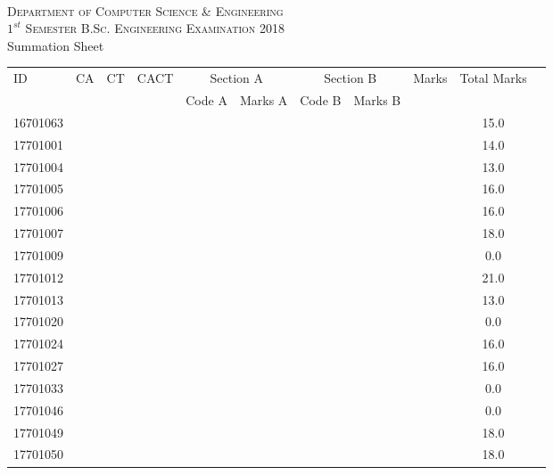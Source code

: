 \documentclass[12pt]{article}
\begin{document}
    \centering
    \begin{minipage}[m]{.8\textwidth} \centering 
	\smallskip
	\\
	\textsc{Department of Computer Science \& Engineering}\\
	\textsc{$1^{st}$ Semester B.Sc. Engineering Examination 2018}\\
	{\large {\sc Summation Sheet}}\\  
    \end{minipage} 
    \begin{center} 
	\renewcommand{\arraystretch}{1.08}
	\begin{small}
    \begin{tabular}{|l|c|c|c|c|c|c|c|c|c|c|} \hline
	\multirow{2}{*}{ID} & 	\multirow{2}{*}{CA}  & 	\multirow{2}{*}{CT}  & 	\multirow{2}{*}{CACT}  & \multicolumn{2 }{|c|}{Section A}& \multicolumn{2 }{c|}{Section B} & 	\multirow{2}{*}{Marks}  & 	\multirow{2}{*}{Total Marks}  \\ 
	&  &  &  & Code A & Marks A & Code B & Marks B&  &  \\ \hline
16701063 &  &  &  &  &  &  &  &  & 15.0\\ \hline 
17701001 &  &  &  &  &  &  &  &  & 14.0\\ \hline 
17701004 &  &  &  &  &  &  &  &  & 13.0\\ \hline 
17701005 &  &  &  &  &  &  &  &  & 16.0\\ \hline 
17701006 &  &  &  &  &  &  &  &  & 16.0\\ \hline 
17701007 &  &  &  &  &  &  &  &  & 18.0\\ \hline 
17701009 &  &  &  &  &  &  &  &  & 0.0\\ \hline 
17701012 &  &  &  &  &  &  &  &  & 21.0\\ \hline 
17701013 &  &  &  &  &  &  &  &  & 13.0\\ \hline 
17701020 &  &  &  &  &  &  &  &  & 0.0\\ \hline 
17701024 &  &  &  &  &  &  &  &  & 16.0\\ \hline 
17701027 &  &  &  &  &  &  &  &  & 16.0\\ \hline 
17701033 &  &  &  &  &  &  &  &  & 0.0\\ \hline 
17701046 &  &  &  &  &  &  &  &  & 0.0\\ \hline 
17701049 &  &  &  &  &  &  &  &  & 18.0\\ \hline 
17701050 &  &  &  &  &  &  &  &  & 18.0\\ \hline 

\end{tabular}
\end{small}
\end{center}
\end{document}
